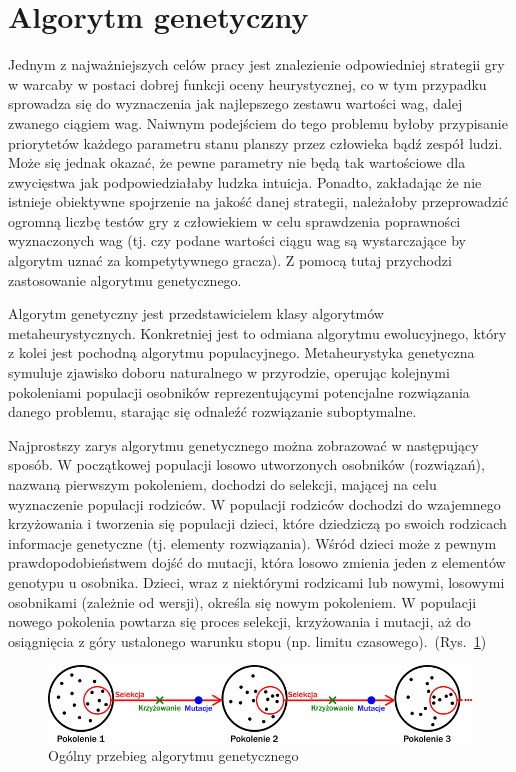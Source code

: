 \FloatBarrier

\section{Algorytm genetyczny}
\label{podrozdzial2-3}

Jednym z najważniejszych celów pracy jest znalezienie odpowiedniej strategii gry w warcaby w postaci dobrej funkcji oceny heurystycznej, co w tym przypadku sprowadza się do wyznaczenia jak najlepszego zestawu wartości wag, dalej zwanego ciągiem wag. Naiwnym podejściem do tego problemu byłoby przypisanie priorytetów każdego parametru stanu planszy przez człowieka bądź zespół ludzi. Może się jednak okazać, że pewne parametry nie będą tak wartościowe dla zwycięstwa jak podpowiedziałaby ludzka intuicja. Ponadto, zakładając że nie istnieje obiektywne spojrzenie na jakość danej strategii, należałoby przeprowadzić ogromną liczbę testów gry z człowiekiem w celu sprawdzenia poprawności wyznaczonych wag (tj. czy podane wartości ciągu wag są wystarczające by algorytm uznać za kompetytywnego gracza). Z pomocą tutaj przychodzi zastosowanie algorytmu genetycznego.

Algorytm genetyczny jest przedstawicielem klasy algorytmów metaheurystycznych. Konkretniej jest to odmiana algorytmu ewolucyjnego, który z kolei jest pochodną algorytmu populacyjnego. Metaheurystyka genetyczna symuluje zjawisko doboru naturalnego w przyrodzie, operując kolejnymi pokoleniami populacji osobników reprezentującymi potencjalne rozwiązania danego problemu, starając się odnaleźć rozwiązanie suboptymalne.

Najprostszy zarys algorytmu genetycznego można zobrazować w następujący sposób. W początkowej populacji losowo utworzonych osobników (rozwiązań), nazwaną pierwszym pokoleniem, dochodzi do selekcji, mającej na celu wyznaczenie populacji rodziców. W populacji rodziców dochodzi do wzajemnego krzyżowania i tworzenia się populacji dzieci, które dziedziczą po swoich rodzicach informacje genetyczne (tj. elementy rozwiązania). Wśród dzieci może z pewnym prawdopodobieństwem dojść do mutacji, która losowo zmienia jeden z elementów genotypu u osobnika. Dzieci, wraz z niektórymi rodzicami lub nowymi, losowymi osobnikami (zależnie od wersji), określa się nowym pokoleniem. W populacji nowego pokolenia powtarza się proces selekcji, krzyżowania i mutacji, aż do osiągnięcia z góry ustalonego warunku stopu (np. limitu czasowego).~(Rys.~\ref{fig:alggen})

\begin{figure}
    \centering
    \includegraphics[scale=.7]{graphics/genetyk_algorytm.png}
    \caption{Ogólny przebieg algorytmu genetycznego}
    \label{fig:alggen}
\end{figure}

